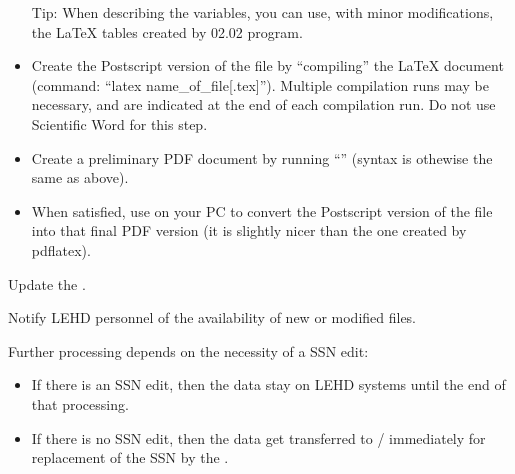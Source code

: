 \begin{description}
\begin{steps}
\begin{itemize}
    raw text editors, or /Workplace.
  \item[Tip:] When describing the variables, you can use, with minor modifications, the \LaTeX{} tables    created by 02.02 program.
  \item Create the Postscript version of the file by ``compiling'' the
    {\LaTeX} document (command: ``latex name\_of\_file[.tex]''). Multiple
    compilation runs may be necessary, and are indicated at the end of each
    compilation run. Do not use Scientific Word for this step.
  \item Create a preliminary PDF document by running ``''
    (syntax is othewise the same as above).
  \item When satisfied, use  on your PC to
    convert the Postscript version of the file into that final PDF version
    (it is slightly nicer than the one created by pdflatex).
  \end{itemize}
\item Update the .
\item Notify LEHD personnel of the availability of new or modified 
  files. 
\end{steps}
\end{description}

Further processing depends on the necessity of a SSN edit:
\begin{itemize}
\item If there is an SSN edit, then the data stay on LEHD systems until the
  end of that processing.
\item If there is no SSN edit, then the data get transferred to /
  immediately for replacement of the SSN by the .
\end{itemize}


